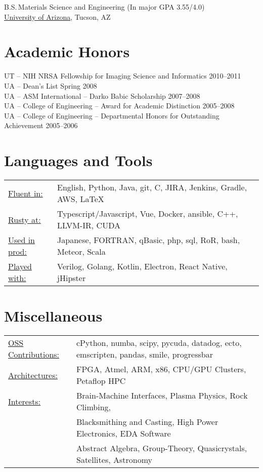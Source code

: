 \documentclass{res}
\begin{document}
\begin{resume}
  B.S.\,Materials Science and Engineering (In major GPA 3.55/4.0) \\
  \href{https://mse.engineering.arizona.edu/}{University of Arizona}, Tucson, AZ

\section{Academic Honors}
UT -- NIH NRSA Fellowship for Imaging Science and Informatics \hfill 2010--2011 \\
UA -- Dean’s List \hfill Spring 2008 \\
UA -- ASM International -- Darko Babic Scholarship \hfill 2007--2008 \\
UA -- College of Engineering -- Award for Academic Distinction \hfill 2005--2008 \\
UA -- College of Engineering -- Departmental Honors for Outstanding Achievement \hfill 2005--2006

\section{Languages and Tools}
 \begin{tabular}{l p{5.5in}}
   \underline{Fluent in:}    & English, Python, Java, git, C, JIRA, Jenkins, Gradle, AWS, \LaTeX \\
   \underline{Rusty at:}     & Typescript/Javascript, Vue, Docker, ansible, C++, LLVM-IR, CUDA \\
   \underline{Used in prod:} & Japanese, FORTRAN, qBasic, php, sql, RoR, bash, Meteor, Scala \\
   \underline{Played with:}  & Verilog, Golang, Kotlin, Electron, React Native, jHipster
 \end{tabular}

\section{Miscellaneous}
  \begin{tabular}{l p{5.5in}}
    \underline{OSS Contributions:} & cPython, numba, scipy, pycuda, datadog, ecto, emscripten, pandas, smile, progressbar  \\
    \underline{Architectures:}     & FPGA, Atmel, ARM, x86, CPU/GPU Clusters, Petaflop HPC \\
    \underline{Interests:}         & Brain-Machine Interfaces, Plasma Physics, Rock Climbing, \\
                                   & Blacksmithing and Casting, High Power Electronics, EDA Software \\
                                   & Abstract Algebra, Group-Theory, Quasicrystals, Satellites, Astronomy
 \end{tabular}

\end{resume}
\end{document}
